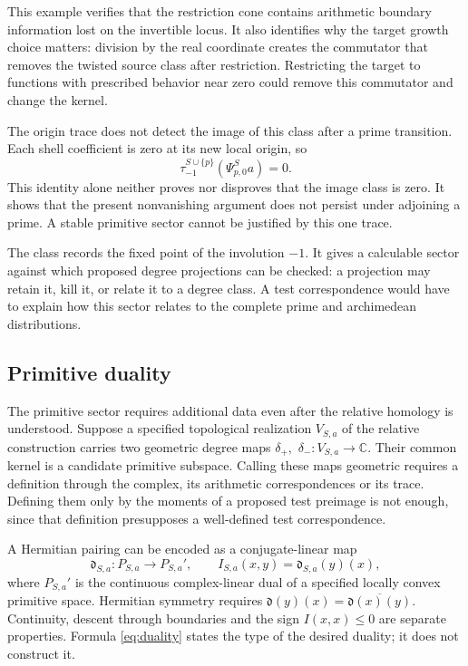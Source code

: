 \documentclass[11pt,letterpaper]{article}
\theoremstyle{definition}
\theoremstyle{remark}
\newcommand{\C}{\mathbb C}
\begin{document}
This example verifies that the restriction cone contains
arithmetic boundary information lost on the invertible locus.
It also identifies why the target growth choice matters:
division by the real coordinate creates the commutator that
removes the twisted source class after restriction. Restricting
the target to functions with prescribed behavior near zero
could remove this commutator and change the kernel.

The origin trace does not detect the image of this class after
a prime transition. Each shell coefficient is zero at its
new local origin, so
\begin{equation}
 \tau_{-1}^{S\cup\{p\}}(\Psi_{p,0}^Sa)=0.
 \label{eq:trace-shell-zero}
\end{equation}
This identity alone neither proves nor disproves that the
image class is zero. It shows that the present nonvanishing
argument does not persist under adjoining a prime. A stable
primitive sector cannot be justified by this one trace.

The class records the fixed point of the involution $-1$.
It gives a calculable sector against which proposed degree
projections can be checked: a projection may retain it, kill
it, or relate it to a degree class. A test correspondence
would have to explain how this sector relates to the complete
prime and archimedean distributions.

\subsection{Primitive duality}

The primitive sector requires additional data even after the
relative homology is understood. Suppose a specified topological
realization $V_{S,a}$ of the relative construction carries two
geometric degree maps $\delta_+,$ $\delta_-:V_{S,a}\to\C$.
Their common kernel is a candidate primitive subspace. Calling
these maps geometric requires a definition through the complex,
its arithmetic correspondences or its trace. Defining them only
by the moments of a proposed test preimage is not enough, since
that definition presupposes a well-defined test correspondence.

A Hermitian pairing can be encoded as a conjugate-linear map
\begin{equation}
 \mathfrak d_{S,a}:P_{S,a}\longrightarrow P_{S,a}',\qquad
 I_{S,a}(x,y)=\mathfrak d_{S,a}(y)(x),
 \label{eq:duality}
\end{equation}
where $P_{S,a}'$ is the continuous complex-linear dual of a specified
locally convex primitive space. Hermitian symmetry requires
$\mathfrak d(y)(x)=\overline{\mathfrak d(x)(y)}$. Continuity,
descent through boundaries and the sign $I(x,x)\le0$ are separate
properties. Formula \eqref{eq:duality} states the type of the desired
duality; it does not construct it.
\end{document}
